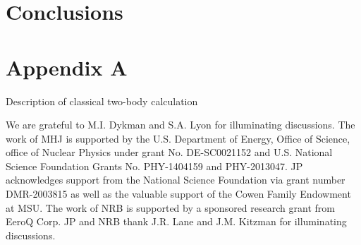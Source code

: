 \documentclass[twocolumn,superscriptaddress,unsortedaddress,
 amsmath,amssymb,
 aps,
]{revtex4-2}
\begin{document}

\section{Conclusions} %


\section{Appendix A}
Description of classical two-body calculation


\begin{acknowledgments}
We are grateful to M.I. Dykman and S.A. Lyon for illuminating discussions. The work of MHJ is supported by the U.S. Department of Energy, Office of Science, office of Nuclear Physics under grant No. DE-SC0021152 and U.S. National Science Foundation Grants No. PHY-1404159 and PHY-2013047. JP acknowledges support from the National Science Foundation via grant number DMR-2003815 as well as the valuable support of the Cowen Family Endowment at MSU. The work of NRB is supported by a sponsored research grant from EeroQ Corp. JP and NRB thank J.R. Lane and J.M. Kitzman for illuminating discussions.
\end{acknowledgments}
\end{document}
